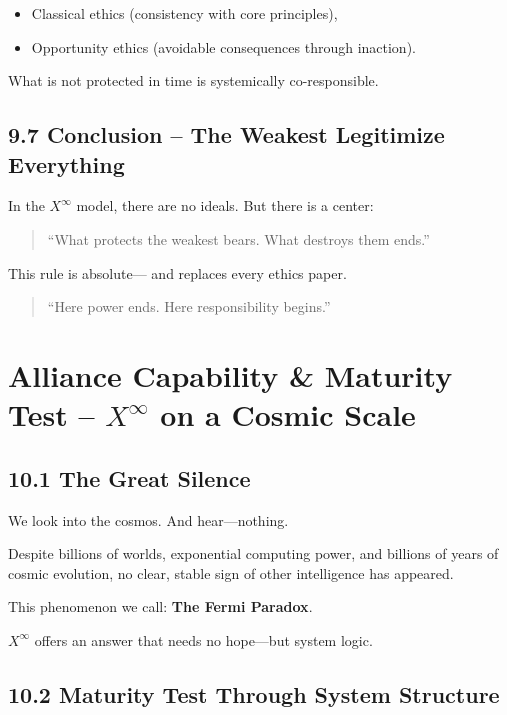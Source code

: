 \documentclass[12pt,a4paper]{book}
\begin{document}
\begin{itemize}
    \item Classical ethics (consistency with core principles),
    \item Opportunity ethics (avoidable consequences through inaction).
\end{itemize}

What is not protected in time is systemically co-responsible.

\section*{9.7 Conclusion – The Weakest Legitimize Everything}

In the $X^\infty$ model, there are no ideals.  
But there is a center:

\begin{quote}
“What protects the weakest bears.  
What destroys them ends.”  
\end{quote}

This rule is absolute—  
and replaces every ethics paper.

\begin{quote}
“Here power ends.  
Here responsibility begins.”  
\end{quote}

\chapter{Alliance Capability \& Maturity Test – $X^\infty$ on a Cosmic Scale}

\section*{10.1 The Great Silence}

We look into the cosmos.  
And hear—nothing.

Despite billions of worlds, exponential computing power, and billions of years of cosmic evolution,  
no clear, stable sign of other intelligence has appeared.

This phenomenon we call:  
\textbf{The Fermi Paradox}.

$X^\infty$ offers an answer that needs no hope—but system logic.

\section*{10.2 Maturity Test Through System Structure}
\end{document}
